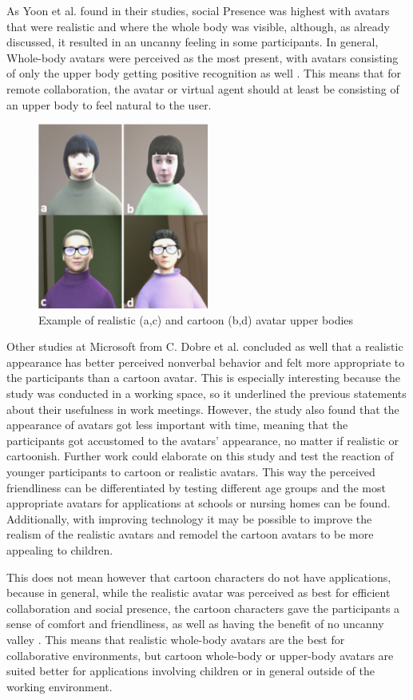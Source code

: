 As Yoon et al. found in their studies, social Presence was highest with avatars that were realistic and where the whole body was visible, although, as already discussed, it resulted in an uncanny feeling in some participants. In general, Whole-body avatars were perceived as the most present, with avatars consisting of only the upper body getting positive recognition as well \cite{8797719}. This means that for remote collaboration, the avatar or virtual agent should at least be consisting of an upper body to feel natural to the user. 

\begin{figure}[H]
\centering
\includegraphics[width = 0.5\textwidth]{figures/Bildschirmfoto 2022-06-10 um 19.48.36}
\caption[Study 1 setup]{Example of realistic (a,c) and cartoon (b,d) avatar upper bodies}
\label{fig::solutions}
\end{figure}

Other studies at Microsoft from C. Dobre et al. \cite{Microsoft} concluded as well that a realistic appearance has better perceived nonverbal behavior and felt more appropriate to the participants than a cartoon avatar. This is especially interesting because the study was conducted in a working space, so it underlined the previous statements about their usefulness in work meetings. However, the study also found that the appearance of avatars got less important with time, meaning that the participants got accustomed to the avatars' appearance, no matter if realistic or cartoonish. Further work could elaborate on this study and test the reaction of younger participants to cartoon or realistic avatars. This way the perceived friendliness can be differentiated by testing different age groups and the most appropriate avatars for applications at schools or nursing homes can be found. Additionally, with improving technology it may be possible to improve the realism of the realistic avatars and remodel the cartoon avatars to be more appealing to children.

This does not mean however that cartoon characters do not have applications, because in general, while the realistic avatar was perceived as best for efficient collaboration and social presence, the cartoon characters gave the participants a sense of comfort and friendliness, as well as having the benefit of no uncanny valley \cite{8797719}. This means that realistic whole-body avatars are the best for collaborative environments, but cartoon whole-body or upper-body avatars are suited better for applications involving children or in general outside of the working environment.
